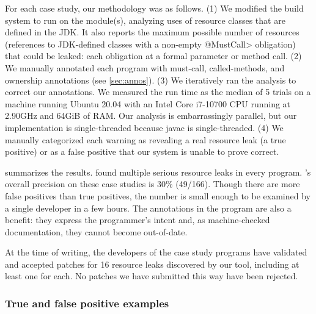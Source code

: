 For each case study, our methodology was as follows.
(1)
We modified the
build system to run \tool on the module(s), analyzing uses of resource
classes that are defined in the JDK\@.
It also reports the maximum possible number of resources (references to JDK-defined
classes with a non-empty \<@MustCall> obligation) that could be
leaked:  each obligation at a formal parameter or method call.
(2) We manually
annotated each program with must-call, called-methods, and ownership
annotations (see \cref{sec:annos}).
(3) We iteratively ran the analysis to correct our annotations.
We measured the run time
as the median of 5 trials on
a machine running Ubuntu 20.04 with an Intel Core i7-10700 CPU running at 2.90GHz and 64GiB of RAM\@.
Our analysis is embarrassingly parallel, but our implementation is
single-threaded because javac is single-threaded.
(4) We manually categorized each warning as revealing a
real resource leak (a true positive) or as a
false positive that our system is unable to prove correct.

 summarizes the results. \Tool found multiple
serious resource leaks in every program. \Tool's overall precision on
these case studies is 30\% (49/166). Though there are more false positives
than true positives,
the number is small enough to be examined by a single developer in a
few hours.
The annotations in the program are
also a benefit: they
express the programmer's intent and, as machine-checked documentation,
they cannot become out-of-date.

%
At the time of writing,
the developers of the case study programs have validated and accepted
patches for 16 resource leaks discovered by our tool, including at least one for each.
No patches we have submitted this way have been rejected.

\subsubsection{True and false positive examples}
\label{sec:examples}

